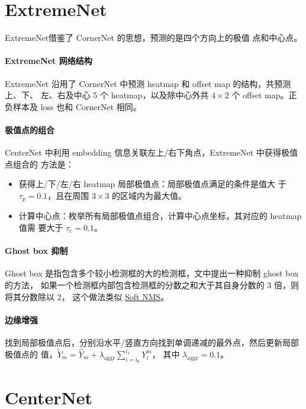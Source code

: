 \section{ExtremeNet}
\label{sec:ExtremeNet}
ExtremeNet借鉴了 CornerNet 的思想，预测的是四个方向上的极值
点和中心点。

\paragraph{ExtremeNet 网络结构}
ExtremeNet 沿用了 CornerNet 中预测 heatmap 和 offset map 的结构，共预测上、下、
左、右及中心 5 个 heatmap，以及除中心外共 $4 \times 2$ 个 offset map。正负样本及
loss 也和 CornerNet 相同。

\paragraph{极值点的组合}
CenterNet 中利用 embedding 信息关联左上/右下角点，ExtremeNet 中获得极值点组合的
方法是：

\begin{itemize}
  \item 获得上/下/左/右 heatmap 局部极值点：局部极值点满足的条件是值大
    于 $\tau_p=0.1$，且在周围 $3 \times 3$ 的区域内为最大值。
  \item 计算中心点：枚举所有局部极值点组合，计算中心点坐标，其对应的 heatmap 值需
    要大于 $\tau_c=0.1$。
\end{itemize}

\paragraph{Ghost box 抑制}
Ghost box 是指包含多个较小检测框的大的检测框，文中提出一种抑制 ghost box 的方法，
如果一个检测框内部包含检测框的分数之和大于其自身分数的 3 倍，则将其分数除以 2，
这个做法类似 \hyperref[subsec:soft-nms]{Soft NMS}。

\paragraph{边缘增强}
找到局部极值点后，分别沿水平/竖直方向找到单调递减的最外点，然后更新局部极值点的
值，$\tilde{Y}_m = \hat{Y}_m + \lambda_{\mathrm{aggr}}\sum_{i=i_0}^{i_1}Y_i^m$，
其中 $\lambda_{\mathrm{aggr}}=0.1$。

\section{CenterNet}
\label{sec:CenterNet}

